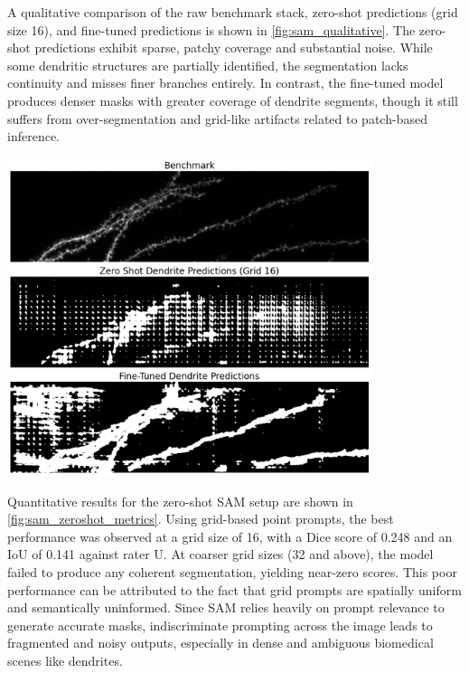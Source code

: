 A qualitative comparison of the raw benchmark stack, zero-shot predictions (grid size 16), and fine-tuned predictions is shown in \autoref{fig:sam_qualitative}. The zero-shot predictions exhibit sparse, patchy coverage and substantial noise. While some dendritic structures are partially identified, the segmentation lacks continuity and misses finer branches entirely. In contrast, the fine-tuned model produces denser masks with greater coverage of dendrite segments, though it still suffers from over-segmentation and grid-like artifacts related to patch-based inference.

\begin{center}
\includegraphics[width=0.8\textwidth]{figures/24_sam_qualitative.png}
\label{fig:sam_qualitative}
\end{center}

Quantitative results for the zero-shot \gls{SAM} setup are shown in \autoref{fig:sam_zeroshot_metrics}. Using grid-based point prompts, the best performance was observed at a grid size of 16, with a Dice score of 0.248 and an \gls{IoU} of 0.141 against rater U. At coarser grid sizes (32 and above), the model failed to produce any coherent segmentation, yielding near-zero scores. This poor performance can be attributed to the fact that grid prompts are spatially uniform and semantically uninformed. Since \gls{SAM} relies heavily on prompt relevance to generate accurate masks, indiscriminate prompting across the image leads to fragmented and noisy outputs, especially in dense and ambiguous biomedical scenes like dendrites.

